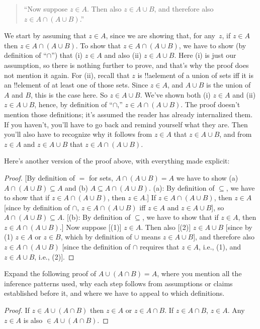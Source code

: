 \documentclass[../../../include/open-logic-section]{subfiles}
\begin{document}
\begin{quote}
``Now suppose $z \in A$. Then also $z \in A \cup B$, and
therefore also $z \in A \cap (A \cup B)$.''
\end{quote}

We start by assuming that $z \in A$, since we are showing that, for
any~$z$, if $z \in A$ then $z \in A \cap (A \cup B)$.  To show that $z
\in A \cap (A \cup B)$, we have to show (by definition of ``$\cap$'')
that (i) $z \in A$ and also (ii) $z \in A \cup B$. Here (i) is just
our assumption, so there is nothing further to prove, and that's why
the proof does not mention it again. For (ii), recall that $z$ is
!!a{element} of a union of sets iff it is an !!{element} of at least
one of those sets. Since $z \in A$, and $A \cup B$ is the union of $A$
and $B$, this is the case here. So $z \in A \cup B$. We've shown both
(i) $z \in A$ and (ii) $z \in A \cup B$, hence, by definition of
``$\cap$,'' $z \in A \cap (A \cup B)$.  The proof doesn't mention
those definitions; it's assumed the reader has already internalized
them.  If you haven't, you'll have to go back and remind yourself what
they are. Then you'll also have to recognize why it follows from $z
\in A$ that $z \in A \cup B$, and from $z \in A$ and $z \in A \cup B$
that $z \in A \cap (A \cup B)$.

Here's another version of the proof above, with everything made
explicit:
\begin{proof}{}
[By definition of $=$ for sets, $A \cap (A \cup B) = A$ we have to
  show (a) $A \cap (A \cup B) \subseteq A$ and (b) $A \subseteq A \cap (A
  \cup B)$. (a): By definition of $\subseteq$, we have to show
  that if $z \in A \cap (A \cup B)$, then $z \in A$.]  If $z \in A
\cap (A \cup B)$, then $z \in A$ [since by definition of $\cap$, $z
  \in A \cap (A \cup B)$ iff $z \in A$ and $z \in A \cup B$], so $A
\cap (A \cup B) \subseteq A$. [(b): By definition of $\subseteq$, we
  have to show that if $z \in A$, then $z \in A \cap (A \cup B)$.] Now
suppose [(1)] $z \in A$. Then also [(2)] $z \in A \cup B$ [since by
  (1) $z \in A$ or $z \in B$, which by definition of $\cup$ means $z
  \in A \cup B$], and therefore also $z \in A \cap (A \cup B)$ [since
  the definition of $\cap$ requires that $z \in A$, i.e., (1), and $z
  \in A \cup B$, i.e., (2)].
\end{proof}

\begin{prob}
Expand the following proof of $A \cup (A \cap B) = A$, where you
mention all the inference patterns used, why each step follows from
assumptions or claims established before it, and where we have to
appeal to which definitions.
\begin{proof}
  If $z \in A \cup (A \cap B)$ then $z \in A$ or $z \in A \cap B$. If
  $z \in A \cap B$, $z \in A$. Any $z \in A$ is also $\in A \cup (A
  \cap B)$.
\end{proof}
\end{prob}
\end{document}
